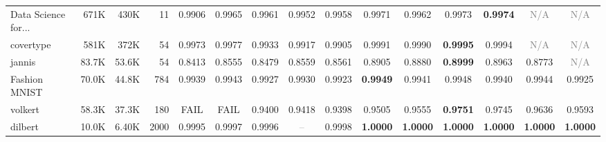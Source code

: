 \begin{table}[t]
{\begin{tabular}{lrrrccccccccccc}
Data Science for... & 671K & 430K & 11 & \cellcolor[HTML]{F4CCCC}0.9906 & \cellcolor[HTML]{E3ECD1}0.9965 & \cellcolor[HTML]{E8EDD0}0.9961 & \cellcolor[HTML]{F2EFCE}0.9952 & \cellcolor[HTML]{EBEED0}0.9958 & \cellcolor[HTML]{DCEBD2}0.9971 & \cellcolor[HTML]{E6EDD1}0.9962 & \cellcolor[HTML]{DAEAD3}0.9973 & \cellcolor[HTML]{D9EAD3}\textbf{0.9974} & \textcolor{gray}{N/A} & \textcolor{gray}{N/A} \\
covertype & 581K & 372K & 54 & \cellcolor[HTML]{ECEED0}0.9973 & \cellcolor[HTML]{E8EDD0}0.9977 & \cellcolor[HTML]{FBE4CC}0.9933 & \cellcolor[HTML]{F7D6CC}0.9917 & \cellcolor[HTML]{F4CCCC}0.9905 & \cellcolor[HTML]{DCEBD2}0.9991 & \cellcolor[HTML]{DDEBD2}0.9990 & \cellcolor[HTML]{D9EAD3}\textbf{0.9995} & \cellcolor[HTML]{DAEAD3}0.9994 & \textcolor{gray}{N/A} & \textcolor{gray}{N/A} \\
jannis & 83.7K & 53.6K & 54 & \cellcolor[HTML]{F4CCCC}0.8413 & \cellcolor[HTML]{F9DECC}0.8555 & \cellcolor[HTML]{F6D5CC}0.8479 & \cellcolor[HTML]{F9DFCC}0.8559 & \cellcolor[HTML]{FADFCC}0.8561 & \cellcolor[HTML]{E5EDD1}0.8905 & \cellcolor[HTML]{E8EDD0}0.8880 & \cellcolor[HTML]{D9EAD3}\textbf{0.8999} & \cellcolor[HTML]{DEEBD2}0.8963 & \cellcolor[HTML]{F6F0CE}0.8773 & \textcolor{gray}{N/A} \\
Fashion MNIST & 70.0K & 44.8K & 784 & \cellcolor[HTML]{F6F0CE}0.9939 & \cellcolor[HTML]{EBEED0}0.9943 & \cellcolor[HTML]{F7D8CC}0.9927 & \cellcolor[HTML]{FAE0CC}0.9930 & \cellcolor[HTML]{F4CCCC}0.9923 & \cellcolor[HTML]{D9EAD3}\textbf{0.9949} & \cellcolor[HTML]{F0EFCF}0.9941 & \cellcolor[HTML]{DCEBD2}0.9948 & \cellcolor[HTML]{F3F0CE}0.9940 & \cellcolor[HTML]{E8EDD0}0.9944 & \cellcolor[HTML]{F6D2CC}0.9925 \\
volkert & 58.3K & 37.3K & 180 & \textcolor{red!70!black}{FAIL} & \textcolor{red!70!black}{FAIL} & \cellcolor[HTML]{F4CCCC}0.9400 & \cellcolor[HTML]{F5D0CC}0.9418 & \cellcolor[HTML]{F4CCCC}0.9398 & \cellcolor[HTML]{FBE3CC}0.9505 & \cellcolor[HTML]{FEEECC}0.9555 & \cellcolor[HTML]{D9EAD3}\textbf{0.9751} & \cellcolor[HTML]{DAEAD3}0.9745 & \cellcolor[HTML]{F2EFCE}0.9636 & \cellcolor[HTML]{FBF1CD}0.9593 \\
dilbert & 10.0K & 6.40K & 2000 & \cellcolor[HTML]{F4CCCC}0.9995 & \cellcolor[HTML]{FDEACC}0.9997 & \cellcolor[HTML]{F8DBCC}0.9996 & \textcolor{gray}{--} & \cellcolor[HTML]{F7F0CD}0.9998 & \cellcolor[HTML]{D9EAD3}\textbf{1.0000} & \cellcolor[HTML]{D9EAD3}\textbf{1.0000} & \cellcolor[HTML]{D9EAD3}\textbf{1.0000} & \cellcolor[HTML]{D9EAD3}\textbf{1.0000} & \cellcolor[HTML]{D9EAD3}\textbf{1.0000} & \cellcolor[HTML]{D9EAD3}\textbf{1.0000} \\

\end{tabular}}
\end{table}
